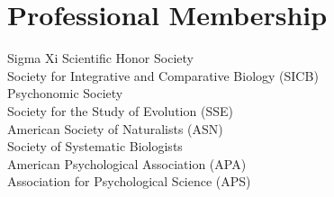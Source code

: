 \section*{Professional Membership}
\years{2021 \textendash}Sigma Xi Scientific Honor Society\\
\years{2020 \textendash}Society for Integrative and Comparative Biology (SICB)\\
\years{2019 \textendash}Psychonomic Society\\
\years{2019 \textendash}Society for the Study of Evolution (SSE)\\
\years{2019 \textendash}American Society of Naturalists (ASN)\\
\years{2019 \textendash}Society of Systematic Biologists\\
\years{2018 \textendash}American Psychological Association (APA)\\
\years{2018 \textendash}Association for Psychological Science (APS)